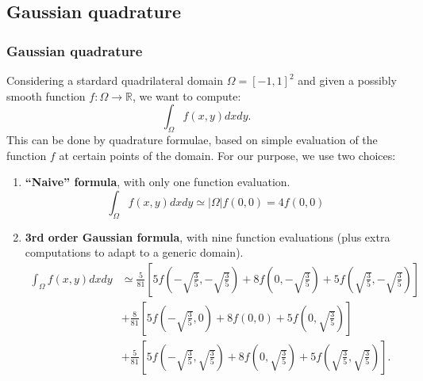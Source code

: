 \documentclass[8pt]{beamer}
\begin{document}
\subsection{Gaussian quadrature}
\begin{frame}
 \frametitle{Gaussian quadrature}
 Considering a stardard quadrilateral domain $\Omega = [-1,1]^2$ and given a possibly smooth function $f : \Omega \to \mathbb{R}$, we want to compute:
 \begin{equation*}
  \int_{\Omega} f(x,y)dxdy.
 \end{equation*}
This can be done by quadrature formulae, based on simple evaluation of the function $f$ at certain points of the domain.
For our purpose, we use two choices:
\begin{enumerate}
 \item \textbf{``Naive'' formula}, with only one function evaluation.
 \begin{equation*}
  \int_{\Omega}f(x,y)dx dy \simeq |\Omega| f(0,0)  = 4 f(0,0)
 \end{equation*}
 \item \textbf{3rd order Gaussian formula}, with nine function evaluations (plus extra computations to adapt to a generic domain).
 \begin{align*}
  \int_{\Omega} f(x,y)dx dy &\simeq \frac{5}{81} \left [ 5 f \left (-\sqrt{\frac{3}{5}},-\sqrt{\frac{3}{5}} \right ) + 8 f \left (0,-\sqrt{\frac{3}{5}} \right ) + 5 f \left (\sqrt{\frac{3}{5}},-\sqrt{\frac{3}{5}} \right )\right ] \\
  &+\frac{8}{81} \left [ 5 f \left (-\sqrt{\frac{3}{5}},0 \right ) + 8 f \left (0,0 \right ) + 5 f \left (0,\sqrt{\frac{3}{5}} \right )\right ] \\
  &+\frac{5}{81} \left [ 5 f \left (-\sqrt{\frac{3}{5}},\sqrt{\frac{3}{5}} \right ) + 8 f \left (0,\sqrt{\frac{3}{5}} \right ) + 5 f \left (\sqrt{\frac{3}{5}},\sqrt{\frac{3}{5}} \right )\right ].
 \end{align*}

\end{enumerate}

\end{frame}
\end{document}
